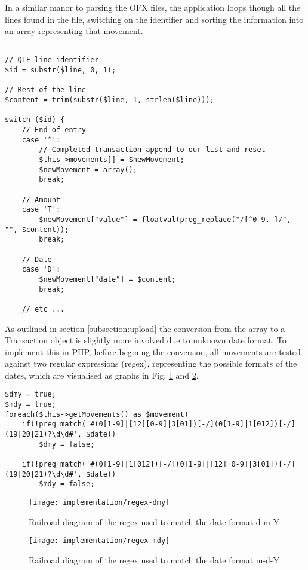 In a similar manor to parsing the OFX files, the application loops though all the lines found in the file, switching on the identifier and sorting the information into an array representing that movement. 

\lstset{style=phpcolor}
\begin{lstlisting}

// QIF line identifier
$id = substr($line, 0, 1);

// Rest of the line
$content = trim(substr($line, 1, strlen($line)));

switch ($id) {
	// End of entry
	case '^':
		// Completed transaction append to our list and reset
		$this->movements[] = $newMovement;
		$newMovement = array();
		break;
		
	// Amount
	case 'T':
		$newMovement["value"] = floatval(preg_replace("/[^0-9.-]/", "", $content));
		break;
		
	// Date
	case 'D':
		$newMovement["date"] = $content;
		break;
		
	// etc ...
\end{lstlisting}

As outlined in section \ref{subsection:upload} the conversion from the array to a Transaction object is slightly more involved due to unknown date format. To implement this in PHP, before begining the conversion, all movements are tested against two regular expressions (regex), representing the possible formats of the dates, which are visualised as graphs in Fig. \ref{fig:regex-dmy} and \ref{fig:regex-mdy}. 

\lstset{style=phpcolor}
\begin{lstlisting}
$dmy = true;
$mdy = true;
foreach($this->getMovements() as $movement)
	if(!preg_match('#(0[1-9]|[12][0-9]|3[01])[-/](0[1-9]|1[012])[-/](19|20|21)?\d\d#', $date))
		$dmy = false;
	
	if(!preg_match('#(0[1-9]|1[012])[-/](0[1-9]|[12][0-9]|3[01])[-/](19|20|21)?\d\d#', $date))
		$mdy = false;
\end{lstlisting}

\begin{figure}[h]
    \centering
    \texttt{[image: implementation/regex-dmy]}
    \caption{Railroad diagram of the regex used to match the date format d-m-Y}
    \label{fig:regex-dmy}
\end{figure}

\begin{figure}[h]
    \centering
    \texttt{[image: implementation/regex-mdy]}
    \caption{Railroad diagram of the regex used to match the date format m-d-Y}
    \label{fig:regex-mdy}
\end{figure}

